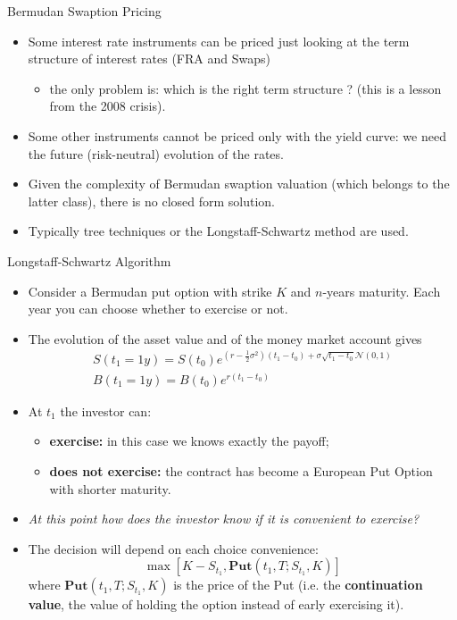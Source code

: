 \documentclass{beamer}
\begin{document}
\begin{frame}{Bermudan Swaption Pricing}
	\begin{itemize}
		\item<1-> Some interest rate instruments can be priced just looking at the term structure of interest rates (FRA and Swaps)
		\begin{itemize}
			\item the only problem is: which is the right term structure ? (this is a lesson from the 2008 crisis).
		\end{itemize}
		\item<2-> Some other instruments cannot be priced only with the yield curve: we need the future (risk-neutral) evolution of the rates.
		\item<3-> Given the complexity of Bermudan swaption valuation (which belongs to the latter class), there is no closed form solution.
		\item<3-> Typically tree techniques or the Longstaff-Schwartz method are used.
	\end{itemize}
\end{frame}

\begin{frame}{Longstaff-Schwartz Algorithm}
	\begin{itemize}
		\item Consider a Bermudan put option with strike $K$ and $n$-years maturity. Each year you can choose whether to exercise or not.
		\item The evolution of the asset value and of the money market account gives
		\begin{equation}
			\begin{gathered}
				S(t_1=1y) = S(t_0)e^{(r-\frac{1}{2}\sigma^2)(t_1-t_0)+\sigma\sqrt{t_1-t_0}\mathcal{N}(0,1)} \\
				B(t_1=1y)=B(t_0)e^{r(t_1-t_0)}
			\end{gathered}
		\end{equation}
		\item At $t_1$ the investor can:
		\begin{itemize}
			\item \textbf{exercise:} in this case we knows exactly the payoff;
			\item \textbf{does not exercise:} the contract has become a European Put Option with shorter maturity.
		\end{itemize}
		\item \emph{At this point how does the investor know if it is convenient to exercise?}
		\item The decision will depend on each choice convenience:
		\begin{equation*}
			\max[K-S_{t_1}, \textbf{Put}(t_1,T;S_{t_1},K)]
		\end{equation*}
		where $\textbf{Put}(t_1,T;S_{t_1},K)$ is the price of the Put (i.e. the \textbf{continuation value}, the value of holding the option instead of early exercising it).
	\end{itemize}
\end{frame}
\end{document}
